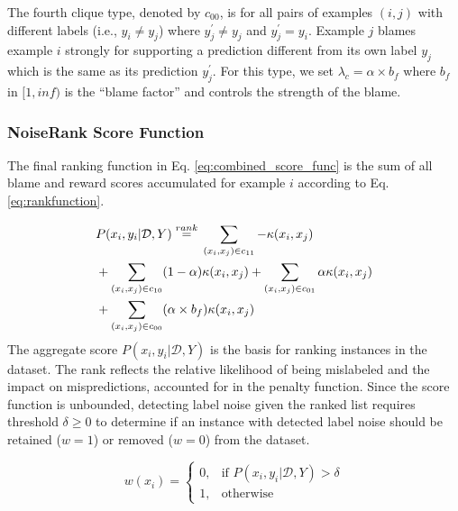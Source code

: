 The fourth clique type, denoted by $c_{00}$, is for all pairs of examples $(i, j)$ with different labels (i.e., $y_i \neq y_j$) where $y_{j}^\prime \neq y_{j}$ and $y_{j}^\prime = y_{i}$. Example $j$ blames example $i$ strongly for supporting a prediction different from its own label $y_j$ which is the same as its prediction $y_j^\prime$. For this type, we set $\lambda_c = \alpha \times b_{f}$ where $b_{f}$ in $[1,inf)$ is the ``blame factor'' and controls the strength of the blame.










\subsubsection{NoiseRank Score Function}




The final ranking function in Eq. \ref{eq:combined_score_func} is the sum of all blame and reward scores accumulated for example $i$ according to Eq. \ref{eq:rankfunction}. 


\begin{eqnarray}
\left.
\begin{aligned} 
&P(x_{i},y_{i}|\mathcal{D},Y) \; {\buildrel {rank} \over =}\;          
  \sum_{(x_i, x_j)\in c_{11}} -\kappa(x_i, x_j) \\ 
&+ \sum_{(x_i, x_j) \in c_{10}} (1 - \alpha) \kappa(x_i, x_j) 
+ \sum_{(x_i, x_j) \in c_{01}} \alpha \kappa(x_i, x_j)  \\ 
&+ \sum_{(x_i, x_j) \in c_{00}} (\alpha \times b_f) \kappa(x_i, x_j)
\end{aligned} \right.
\label{eq:combined_score_func}
\end{eqnarray}
The aggregate score $P(x_{i},y_{i}|\mathcal{D},Y)$ is the basis for ranking instances in the dataset. The rank reflects the relative likelihood of being mislabeled and the impact on mispredictions, accounted for in the penalty function. Since the score function is unbounded, detecting label noise given the ranked list requires threshold $\delta \geq 0$ to determine if an instance with detected label noise should be retained ($w=1$) or removed ($w=0$) from the dataset.

\begin{equation} \label{eq:discard}
    w(x_i)=\begin{cases}
    0, & \text{if $P(x_{i},y_{i}|\mathcal{D},Y) > \delta $} \\
    1, & \text{otherwise}
    \end{cases}
\end{equation}








